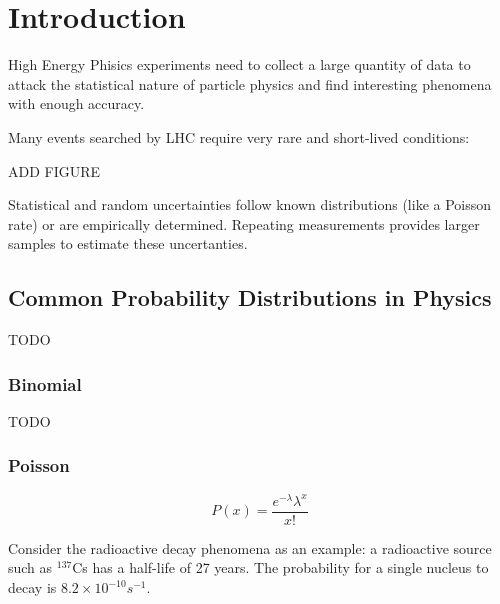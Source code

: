 \chapter{Introduction}










High Energy Phisics experiments need to collect a large quantity of data to attack the statistical nature of particle physics and find interesting phenomena with enough accuracy.

Many events searched by LHC require very rare and short-lived conditions:

ADD FIGURE

Statistical and random uncertainties follow known distributions (like a Poisson rate) or are empirically determined. Repeating measurements provides larger samples to estimate these uncertanties.


\section{Common Probability Distributions in Physics}
TODO
\subsection{Binomial}
TODO
\subsection{Poisson}




$$P\left( x \right) = \frac{{e^{ - \lambda } \lambda ^x }}{{x!}}$$

\cite{leo2012techniques} Consider the radioactive decay phenomena as an example: a radioactive source such as $^{137}$Cs has a half-life of 27 years. The probability for a single nucleus to decay is $8.2 \times 10^{-10}s^{-1}$.

